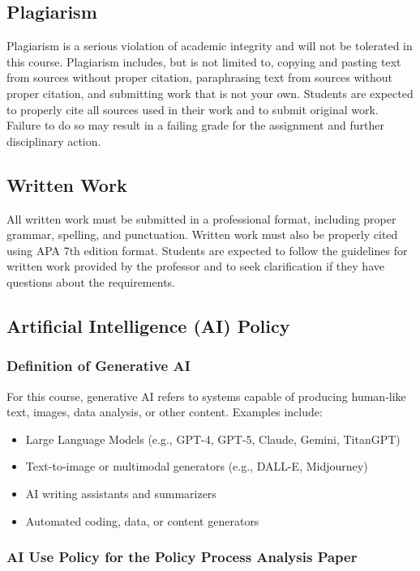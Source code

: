 \documentclass[12pt]{article}     %
\begin{document}
\subsection*{Plagiarism}
Plagiarism is a serious violation of academic integrity and will not be tolerated in this course. Plagiarism includes, but is not limited to, copying and pasting text from sources without proper citation, paraphrasing text from sources without proper citation, and submitting work that is not your own. Students are expected to properly cite all sources used in their work and to submit original work. Failure to do so may result in a failing grade for the assignment and further disciplinary action.

\subsection*{Written Work}
All written work must be submitted in a professional format, including proper grammar, spelling, and punctuation. Written work must also be properly cited using APA 7th edition format. Students are expected to follow the guidelines for written work provided by the professor and to seek clarification if they have questions about the requirements.

\subsection*{Artificial Intelligence (AI) Policy}

\subsubsection*{Definition of Generative AI}

\noindent For this course, generative AI refers to systems capable of producing human-like text, images, data analysis, or other content. Examples include:

\begin{itemize}
    \item Large Language Models (e.g., GPT-4, GPT-5, Claude, Gemini, TitanGPT)
    \item Text-to-image or multimodal generators (e.g., DALL-E, Midjourney)
    \item AI writing assistants and summarizers
    \item Automated coding, data, or content generators
\end{itemize}

\subsubsection*{AI Use Policy for the Policy Process Analysis Paper}
\end{document}
